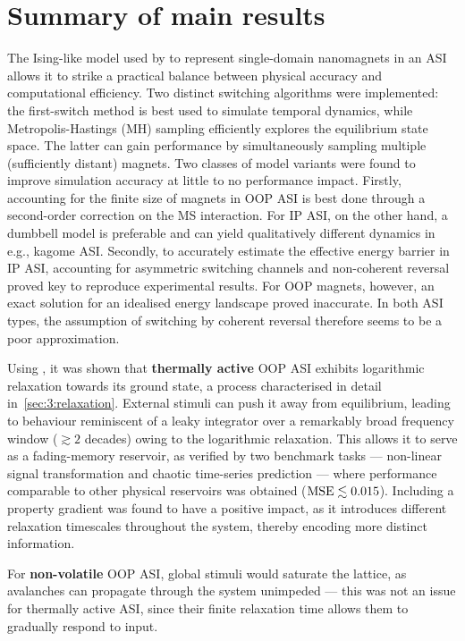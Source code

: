 \section{Summary of main results}
The Ising-like model used by \textbf{\hotspice} to represent single-domain nanomagnets in an ASI allows it to strike a practical balance between physical accuracy and computational efficiency.
Two distinct switching algorithms were implemented: the first-switch method is best used to simulate temporal dynamics, while Metropolis-Hastings (MH) sampling efficiently explores the equilibrium state space.
The latter can gain performance by simultaneously sampling multiple (sufficiently distant) magnets.
Two classes of model variants were found to improve simulation accuracy at little to no performance impact.
Firstly, accounting for the finite size of magnets in OOP ASI is best done through a second-order correction on the MS interaction.
For IP ASI, on the other hand, a dumbbell model is preferable and can yield qualitatively different dynamics in e.g., kagome ASI.
Secondly, to accurately estimate the effective energy barrier in IP ASI, accounting for asymmetric switching channels and non-coherent reversal proved key to reproduce experimental results.
For OOP magnets, however, an exact solution for an idealised energy landscape proved inaccurate.
In both ASI types, the assumption of switching by coherent reversal therefore seems to be a poor approximation. \par
Using \hotspice, it was shown that \textbf{thermally active} OOP ASI exhibits logarithmic relaxation towards its ground state, a process characterised in detail in~\cref{sec:3:relaxation}.
External stimuli can push it away from equilibrium, leading to behaviour reminiscent of a leaky integrator over a remarkably broad frequency window ($\gtrsim 2$ decades) owing to the logarithmic relaxation.
This allows it to serve as a fading-memory reservoir, as verified by two benchmark tasks --- non-linear signal transformation and chaotic time-series prediction --- where performance comparable to other physical reservoirs was obtained ($\mathrm{MSE} \lesssim 0.015$).
Including a property gradient was found to have a positive impact, as it introduces different relaxation timescales throughout the system, thereby encoding more distinct information. \par
For \textbf{non-volatile} OOP ASI, global stimuli would saturate the lattice, as avalanches can propagate through the system unimpeded --- this was not an issue for thermally active ASI, since their finite relaxation time allows them to gradually respond to input.
